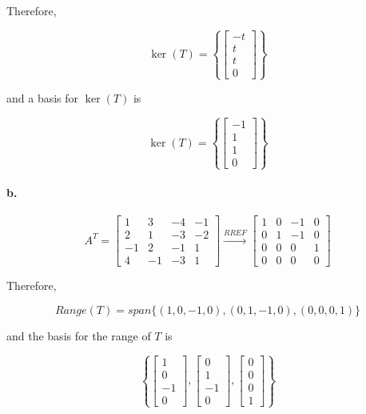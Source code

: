 \documentclass{report}
\begin{document}
\noindent Therefore, 

$$
\ker(T) = \left\{ \begin{bmatrix} -t \\ t \\ t \\ 0 \end{bmatrix} \right\}
$$

\noindent and a basis for $\ker(T)$ is

$$
\ker(T) = \left\{ \begin{bmatrix} -1 \\ 1 \\ 1 \\ 0 \end{bmatrix} \right\}
$$

\paragraph{b.} 

$$
A^T = \begin{bmatrix} 1 & 3 & -4 & -1 \\ 2 & 1 & -3 & -2 \\ -1 & 2 & -1 & 1 \\ 4 & -1 & -3 & 1 \end{bmatrix} \xrightarrow{RREF} \begin{bmatrix} 1 & 0 & -1 & 0 \\ 0 & 1 & -1 & 0 \\ 0 & 0 & 0 & 1 \\ 0 & 0 & 0 & 0 \end{bmatrix}
$$

\noindent Therefore, 

$$
Range(T) = span \{ (1,0,-1,0), (0, 1,-1,0), (0,0,0,1)\}
$$

\noindent and the basis for the range of $T$ is 

$$
\left\{ \begin{bmatrix} 1 \\ 0\\ -1 \\ 0 \end{bmatrix}, \begin{bmatrix} 0 \\1 \\ -1 \\ 0 \end{bmatrix}, \begin{bmatrix} 0 \\ 0 \\ 0 \\ 1\end{bmatrix} \right\}
$$
\end{document}
